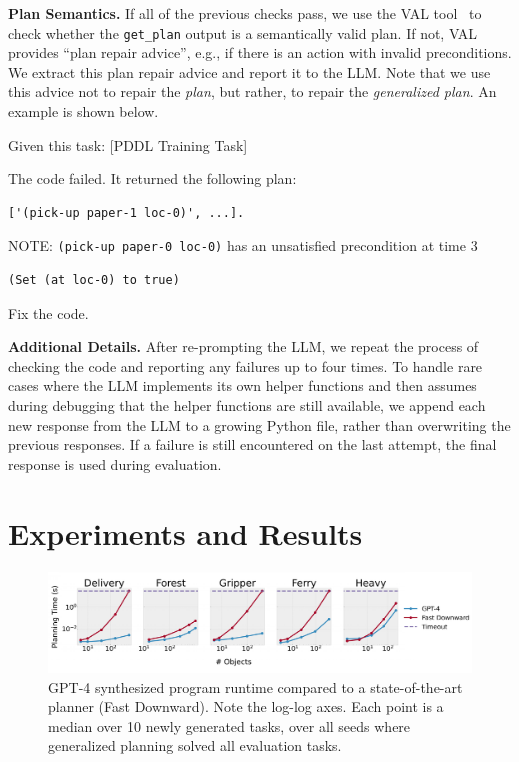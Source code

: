 \documentclass[letterpaper]{article} %
\begin{document}
\textbf{Plan Semantics.}
If all of the previous checks pass, we use the VAL tool~\cite{howey2004val} to check whether the \texttt{get\_plan} output is a semantically valid plan.
If not, VAL provides ``plan repair advice'', e.g., if there is an action with invalid preconditions.
We extract this plan repair advice and report it to the LLM.
Note that we use this advice not to repair the \textit{plan}, but rather, to repair the \emph{generalized plan}.
An example is shown below.

\begin{tcolorbox}[left=2pt,right=2pt]
Given this task: [PDDL Training Task]

The code failed. It returned the following plan:
\begin{verbatim}
['(pick-up paper-1 loc-0)', ...].
\end{verbatim}
NOTE: \texttt{(pick-up paper-0 loc-0)} has an unsatisfied precondition at time 3
\begin{verbatim}
(Set (at loc-0) to true)
\end{verbatim}
Fix the code.
\end{tcolorbox}

\textbf{Additional Details.}
After re-prompting the LLM, we repeat the process of checking the code and reporting any failures up to four times.
To handle rare cases where the LLM implements its own helper functions and then assumes during debugging that the helper functions are still available, we append each new response from the LLM to a growing Python file, rather than overwriting the previous responses.
If a failure is still encountered on the last attempt, the final response is used during evaluation.

\section{Experiments and Results}



\begin{figure}[t]
\includegraphics[width=1.0\textwidth,trim={0 0.5cm 0 0},clip]{problem_size_analysis.pdf}
\caption{GPT-4 synthesized program runtime compared to a state-of-the-art planner (Fast Downward). Note the log-log axes.
Each point is a median over 10 newly generated tasks, over all seeds where generalized planning solved all evaluation tasks.}
\label{fig:problem_size}
\end{figure}
\end{document}
